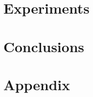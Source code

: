 \documentclass{vldb}
\begin{document}
\section{Experiments}
\label{sec:experiments}


\section{Conclusions}
\label{sec:conclusions}







\newpage
\appendix
\section{Appendix}

\end{document}
